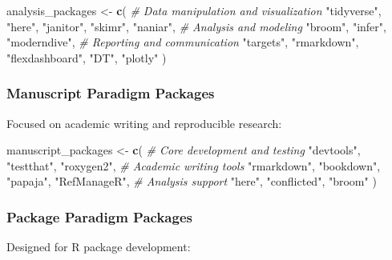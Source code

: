\documentclass[
]{article}
\newenvironment{Shaded}{\begin{snugshade}}{\end{snugshade}}
\newcommand{\CommentTok}[1]{\textcolor[rgb]{0.56,0.35,0.01}{\textit{#1}}}
\newcommand{\FunctionTok}[1]{\textcolor[rgb]{0.13,0.29,0.53}{\textbf{#1}}}
\newcommand{\NormalTok}[1]{#1}
\newcommand{\OtherTok}[1]{\textcolor[rgb]{0.56,0.35,0.01}{#1}}
\newcommand{\StringTok}[1]{\textcolor[rgb]{0.31,0.60,0.02}{#1}}
\begin{document}
\begin{Shaded}
\begin{Highlighting}[]
\NormalTok{analysis\_packages }\OtherTok{\textless{}{-}} \FunctionTok{c}\NormalTok{(}
  \CommentTok{\# Data manipulation and visualization}
  \StringTok{"tidyverse"}\NormalTok{, }\StringTok{"here"}\NormalTok{, }\StringTok{"janitor"}\NormalTok{, }\StringTok{"skimr"}\NormalTok{, }\StringTok{"naniar"}\NormalTok{,}
  \CommentTok{\# Analysis and modeling}
  \StringTok{"broom"}\NormalTok{, }\StringTok{"infer"}\NormalTok{, }\StringTok{"moderndive"}\NormalTok{,}
  \CommentTok{\# Reporting and communication}
  \StringTok{"targets"}\NormalTok{, }\StringTok{"rmarkdown"}\NormalTok{, }\StringTok{"flexdashboard"}\NormalTok{, }\StringTok{"DT"}\NormalTok{, }\StringTok{"plotly"}
\NormalTok{)}
\end{Highlighting}
\end{Shaded}

\subsubsection{Manuscript Paradigm
Packages}\label{manuscript-paradigm-packages}

Focused on academic writing and reproducible research:

\begin{Shaded}
\begin{Highlighting}[]
\NormalTok{manuscript\_packages }\OtherTok{\textless{}{-}} \FunctionTok{c}\NormalTok{(}
  \CommentTok{\# Core development and testing}
  \StringTok{"devtools"}\NormalTok{, }\StringTok{"testthat"}\NormalTok{, }\StringTok{"roxygen2"}\NormalTok{,}
  \CommentTok{\# Academic writing tools}
  \StringTok{"rmarkdown"}\NormalTok{, }\StringTok{"bookdown"}\NormalTok{, }\StringTok{"papaja"}\NormalTok{, }\StringTok{"RefManageR"}\NormalTok{,}
  \CommentTok{\# Analysis support}
  \StringTok{"here"}\NormalTok{, }\StringTok{"conflicted"}\NormalTok{, }\StringTok{"broom"}
\NormalTok{)}
\end{Highlighting}
\end{Shaded}

\subsubsection{Package Paradigm
Packages}\label{package-paradigm-packages}

Designed for R package development:
\end{document}
